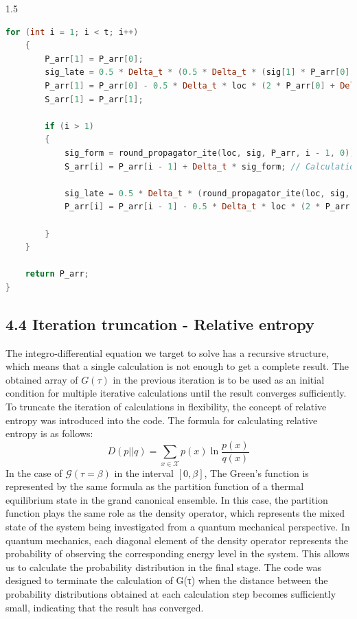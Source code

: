 \documentclass{article}[12pt]
\numberwithin{equation}{section}
\begin{document}
\begin{spacing}{1.5}
\begin{lstlisting}[language=C++, caption=Trapezoidal calculation code]
    for (int i = 1; i < t; i++)
    {
        P_arr[1] = P_arr[0];
        sig_late = 0.5 * Delta_t * (0.5 * Delta_t * (sig[1] * P_arr[0] + sig[0] * (P_arr[0] + Delta_t * P_arr[0])));
        P_arr[1] = P_arr[0] - 0.5 * Delta_t * loc * (2 * P_arr[0] + Delta_t * P_arr[0]) + sig_late;
        S_arr[1] = P_arr[1];

        if (i > 1)
        {
            sig_form = round_propagator_ite(loc, sig, P_arr, i - 1, 0);
            S_arr[i] = P_arr[i - 1] + Delta_t * sig_form; // Calculation process of 2. is performed in this part.

            sig_late = 0.5 * Delta_t * (round_propagator_ite(loc, sig, P_arr, i - 1, 1) + round_propagator_ite(loc, sig, S_arr, i, 1)); // This part is the result of performing trapezoidal calculation for the integral calculation in the round propagator.
            P_arr[i] = P_arr[i - 1] - 0.5 * Delta_t * loc * (2 * P_arr[i - 1] + Delta_t * sig_form) + sig_late; // This part is the result of performing trapezoidal calculation for the integral calculation in the round propagator.

        }
    }

    return P_arr;
}
\end{lstlisting}
\subsection{4.4 Iteration truncation - Relative entropy}

The integro-differential equation we target to solve has a recursive structure, which means that a single calculation is not enough to get a complete result. The obtained array of $G(\tau)$ in the previous iteration is to be used as an initial condition for multiple iterative calculations until the result converges sufficiently. To truncate the iteration of calculations in flexibility, the concept of relative entropy was introduced into the code. The formula for calculating relative entropy is as follows:
\begin{equation*}
D(p||q) = \sum_{x\in\mathcal{X}}p(x)\ln\frac{p(x)}{q(x)}
\end{equation*}
In the case of $\mathcal{G}(\tau = \beta)$ in the interval $[0,\beta]$, The Green's function is represented by the same formula as the partition function of a thermal equilibrium state in the grand canonical ensemble. In this case, the partition function plays the same role as the density operator, which represents the mixed state of the system being investigated from a quantum mechanical perspective.
In quantum mechanics, each diagonal element of the density operator represents the probability of observing the corresponding energy level in the system. This allows us to calculate the probability distribution in the final stage. The code was designed to terminate the calculation of G(τ) when the distance between the probability distributions obtained at each calculation step becomes sufficiently small, indicating that the result has converged.


\end{spacing}
\end{document}
